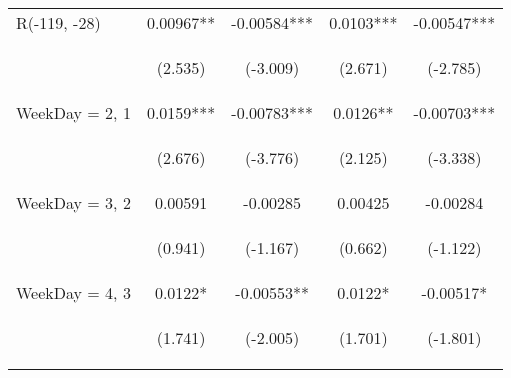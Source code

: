 \documentclass[]{article}
\begin{document}
\begin{center}
\begin{tabular}{lcccc}
R(-119, -28) & 0.00967** & -0.00584*** & 0.0103*** & -0.00547*** \\
\vspace{4pt} & \begin{footnotesize}(2.535)\end{footnotesize} & \begin{footnotesize}(-3.009)\end{footnotesize} & \begin{footnotesize}(2.671)\end{footnotesize} & \begin{footnotesize}(-2.785)\end{footnotesize} \\
WeekDay = 2, 1 & 0.0159*** & -0.00783*** & 0.0126** & -0.00703*** \\
\vspace{4pt} & \begin{footnotesize}(2.676)\end{footnotesize} & \begin{footnotesize}(-3.776)\end{footnotesize} & \begin{footnotesize}(2.125)\end{footnotesize} & \begin{footnotesize}(-3.338)\end{footnotesize} \\
WeekDay = 3, 2 & 0.00591 & -0.00285 & 0.00425 & -0.00284 \\
\vspace{4pt} & \begin{footnotesize}(0.941)\end{footnotesize} & \begin{footnotesize}(-1.167)\end{footnotesize} & \begin{footnotesize}(0.662)\end{footnotesize} & \begin{footnotesize}(-1.122)\end{footnotesize} \\
WeekDay = 4, 3 & 0.0122* & -0.00553** & 0.0122* & -0.00517* \\
\vspace{4pt} & \begin{footnotesize}(1.741)\end{footnotesize} & \begin{footnotesize}(-2.005)\end{footnotesize} & \begin{footnotesize}(1.701)\end{footnotesize} & \begin{footnotesize}(-1.801)\end{footnotesize} \\

\end{tabular}
\end{center}
\end{document}
